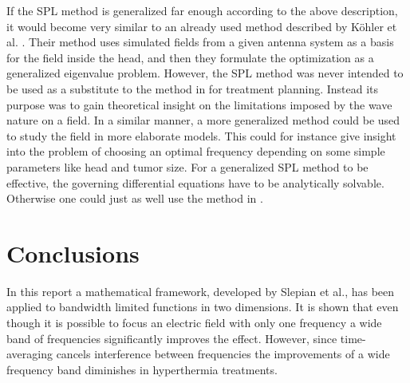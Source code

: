 \documentclass[11pt,a4paper, 
swedish,english %
]{article}
\begin{document}

If the SPL method is generalized far enough according to the above
description, it would become very similar to an already used method
described by Köhler et al. \cite{Kohler2001}. Their method uses
simulated fields from a given antenna system as a basis for the field
inside the head, and then they formulate the optimization as a generalized eigenvalue problem. 
However, the SPL method was never intended to be used as a substitute
to the method in \cite{Kohler2001} for treatment planning. 
Instead its purpose was to gain theoretical insight on the limitations
imposed by the wave nature on a field. In a similar manner, a more
generalized method could be used to study the field in more elaborate
models. This could for instance give insight into the problem of
choosing an optimal frequency depending on some simple parameters like
head and tumor size.
For a generalized SPL method to be effective, the governing differential 
equations have to be analytically solvable. Otherwise one could just as well use the
method in \cite{Kohler2001}.



\section{Conclusions}
In this report a mathematical framework, developed by Slepian et al.,
has been applied to bandwidth limited functions in two dimensions. It
is shown that even though it is possible to focus an electric field with only
one frequency a wide band of frequencies significantly improves the effect.
However, since time-averaging cancels interference between frequencies 
the improvements of a wide frequency band diminishes
in hyperthermia treatments. 





\end{document}
